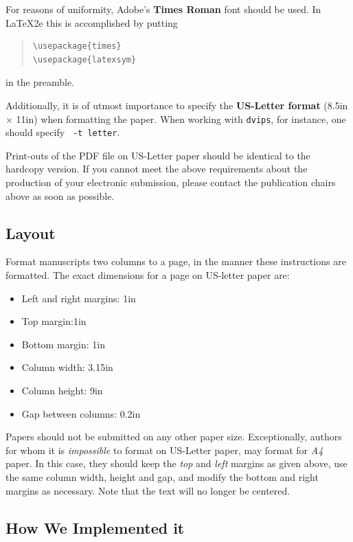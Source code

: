 \documentclass[11pt,letterpaper]{article}
\begin{document}
For reasons of uniformity, Adobe's {\bf Times Roman} font should be
used. In \LaTeX2e{} this is accomplished by putting

\begin{quote}
\begin{verbatim}
\usepackage{times}
\usepackage{latexsym}
\end{verbatim}
\end{quote}
in the preamble.

Additionally, it is of utmost importance to specify the {\bf
  US-Letter format} (8.5in $\times$ 11in) when formatting the paper.
When working with {\tt dvips}, for instance, one should specify {\tt
  -t letter}.

Print-outs of the PDF file on US-Letter paper should be identical to the
hardcopy version.  If you cannot meet the above requirements about the
production of your electronic submission, please contact the
publication chairs above  as soon as possible.


\subsection{Layout}
\label{ssec:layout}

Format manuscripts two columns to a page, in the manner these
instructions are formatted. The exact dimensions for a page on US-letter
paper are:

\begin{itemize}
\item Left and right margins: 1in
\item Top margin:1in
\item Bottom margin: 1in
\item Column width: 3.15in
\item Column height: 9in
\item Gap between columns: 0.2in
\end{itemize}

\noindent Papers should not be submitted on any other paper size. Exceptionally,
authors for whom it is \emph{impossible} to format on US-Letter paper,
may format for \emph{A4} paper. In this case, they should keep the \emph{top}
and \emph{left} margins as given above, use the same column width,
height and gap, and modify the bottom and right margins as necessary.
Note that the text will no longer be centered.

\subsection{How We Implemented it}
\label{ssec:first}
\end{document}
